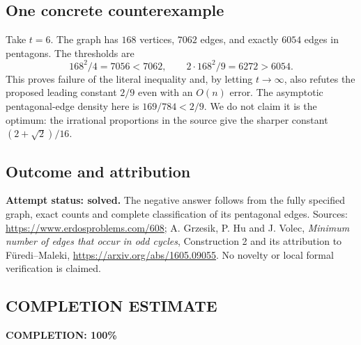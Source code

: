\subsection*{One concrete counterexample}
Take $t=6$. The graph has $168$ vertices, $7062$ edges, and exactly $6054$ edges in pentagons. The thresholds are
\[168^2/4=7056<7062,\qquad 2\cdot168^2/9=6272>6054.
\]
This proves failure of the literal inequality and, by letting $t\to\infty$, also refutes the proposed leading constant $2/9$ even with an $O(n)$ error. The asymptotic pentagonal-edge density here is $169/784<2/9$. We do not claim it is the optimum: the irrational proportions in the source give the sharper constant $(2+\sqrt2)/16$.

\subsection*{Outcome and attribution}
\textbf{Attempt status: solved.} The negative answer follows from the fully specified graph, exact counts and complete classification of its pentagonal edges. Sources: \url{https://www.erdosproblems.com/608}; A. Grzesik, P. Hu and J. Volec, \emph{Minimum number of edges that occur in odd cycles}, Construction 2 and its attribution to F\"uredi--Maleki, \url{https://arxiv.org/abs/1605.09055}. No novelty or local formal verification is claimed.

\subsection*{COMPLETION ESTIMATE}
\textbf{COMPLETION: 100\%}

